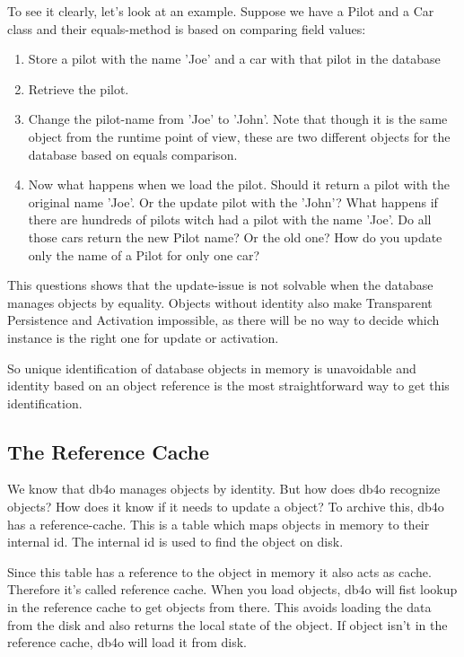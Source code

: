 To see it clearly, let's look at an example. Suppose we have a Pilot and a Car class and their equals-method is based on comparing field values:

\begin{enumerate}
\item Store a pilot with the name 'Joe' and a car with that pilot in the database
\item Retrieve the pilot.
\item Change the pilot-name from 'Joe' to 'John'. Note that though it is the same object from the runtime point of view, these are two different objects for the database based on equals comparison.
\item Now what happens when we load the pilot. Should it return a pilot with the original name 'Joe'. Or the update pilot with the 'John'? What happens if there are hundreds of pilots witch had a pilot with the name 'Joe'. Do all those cars return the new Pilot name? Or the old one? How do you update only the name of a Pilot for only one car?
\end{enumerate}

This questions shows that the update-issue is not solvable when the database manages objects by equality. Objects without identity also make Transparent Persistence and Activation impossible, as there will be no way to decide which instance is the right one for update or activation.

So unique identification of database objects in memory is unavoidable and identity based on an object reference is the most straightforward way to get this identification.

\subsection{The Reference Cache}
\label{ref:basics-indentity-concept-reference-cache}

We know that db4o manages objects by identity. But how does db4o recognize objects? How does it know if it needs to update a object? To archive this, db4o has a reference-cache. This is a table which maps objects in memory to their internal id. The internal id is used to find the object on disk.

Since this table has a reference to the object in memory it also acts as cache. Therefore it's called reference cache. When you load objects, db4o will fist lookup in the reference cache to get objects from there. This avoids loading the data from the disk and also returns the local state of the object. If object isn't in the reference cache, db4o will load it from disk.

